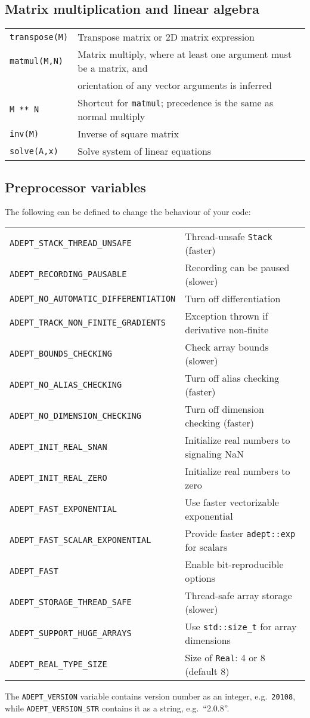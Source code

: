 \documentclass[10pt,a4,landscape]{article}
\def\code#1{\texttt{#1}}
\begin{document}
\subsection*{Matrix multiplication and linear algebra}
\begin{tabular}{ll}
\code{transpose(M)} & Transpose matrix or 2D matrix expression\\
\code{matmul(M,N)} & Matrix multiply, where at least one argument must
be a matrix, and \\
&orientation of any vector arguments is inferred\\
\code{M ** N} & Shortcut for \code{matmul}; precedence is the same as normal
  multiply\\
\code{inv(M)} & Inverse of square matrix\\
\code{solve(A,x)} & Solve system of linear equations\\ 
\end{tabular}

\subsection*{Preprocessor variables}
The following can be defined to change the behaviour of your code:\\
\begin{tabular}{ll}
\code{ADEPT\_STACK\_THREAD\_UNSAFE} & Thread-unsafe \code{Stack} (faster)\\
\code{ADEPT\_RECORDING\_PAUSABLE} & Recording can be paused (slower)\\
\code{ADEPT\_NO\_AUTOMATIC\_DIFFERENTIATION} & Turn off differentiation\\
\code{ADEPT\_TRACK\_NON\_FINITE\_GRADIENTS} & Exception thrown if derivative non-finite\\
\code{ADEPT\_BOUNDS\_CHECKING} & Check array bounds (slower)\\
\code{ADEPT\_NO\_ALIAS\_CHECKING} & Turn off alias checking (faster)\\
\code{ADEPT\_NO\_DIMENSION\_CHECKING} & Turn off dimension checking (faster)\\
\code{ADEPT\_INIT\_REAL\_SNAN} & Initialize real numbers to signaling NaN\\
\code{ADEPT\_INIT\_REAL\_ZERO} & Initialize real numbers to zero\\
\code{ADEPT\_FAST\_EXPONENTIAL} & Use faster vectorizable exponential\\
\code{ADEPT\_FAST\_SCALAR\_EXPONENTIAL} & Provide faster \code{adept::exp} for scalars\\
\code{ADEPT\_FAST} & Enable bit-reproducible options\\
\code{ADEPT\_STORAGE\_THREAD\_SAFE} & Thread-safe array storage (slower)\\
\code{ADEPT\_SUPPORT\_HUGE\_ARRAYS} & Use \code{std::size\_t} for array dimensions\\
\code{ADEPT\_REAL\_TYPE\_SIZE} & Size of \code{Real}: 4 or 8 (default 8)
\end{tabular}
The \code{ADEPT\_VERSION} variable contains version number as an
integer, e.g.\ \code{20108}, while \code{ADEPT\_VERSION\_STR} contains
it as a string, e.g.\ ``2.0.8''.
\onecolumn
\end{document}
